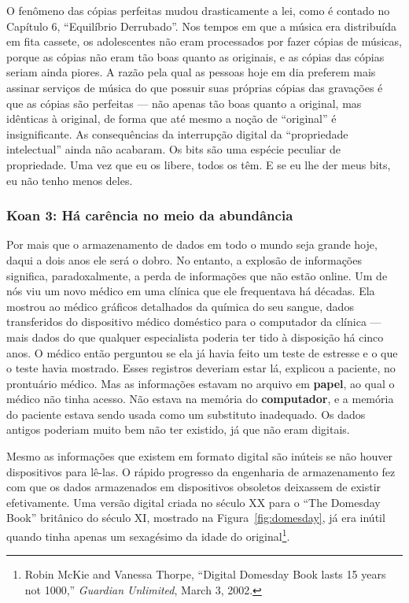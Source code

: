 O fenômeno das cópias perfeitas mudou drasticamente a lei, como é contado no
Capítulo 6, ``Equilíbrio Derrubado''. Nos tempos em que a música era distribuída
em fita cassete, os adolescentes não eram processados por fazer cópias de 
músicas, porque as cópias não eram tão boas quanto as originais, e as cópias das
cópias seriam ainda piores. A razão pela qual as pessoas hoje em dia preferem
mais assinar serviços de música do que possuir suas próprias cópias das
gravações é que as cópias são perfeitas --- não apenas tão boas quanto a
original, mas idênticas à original, de forma que até mesmo a noção de
``original'' é insignificante. As consequências da interrupção digital da
``propriedade intelectual'' ainda não acabaram. Os bits são uma espécie peculiar
de propriedade. Uma vez que eu os libere, todos os têm. E se eu lhe der meus
bits, eu não tenho menos deles.

\subsubsection*{Koan 3: Há carência no meio da abundância}
\label{cap1:exp-dig-koans:3}
Por mais que o armazenamento de dados em todo o mundo seja grande hoje, daqui a
dois anos ele será o dobro. No entanto, a explosão de informações significa, 
paradoxalmente, a perda de informações que não estão online. Um de nós viu um 
novo médico em uma clínica que ele frequentava há décadas. Ela mostrou ao médico
gráficos detalhados da química do seu sangue, dados transferidos do dispositivo
médico doméstico para o computador da clínica --- mais dados do que qualquer
especialista poderia ter tido à disposição há cinco anos. O médico então
perguntou se ela já havia feito um teste de estresse e o que o teste havia 
mostrado. Esses registros deveriam estar lá, explicou a paciente, no prontuário
médico. Mas as informações estavam no arquivo em \textbf{papel}, ao qual o 
médico não tinha acesso. Não estava na memória do \textbf{computador}, e a
memória do paciente estava sendo usada como um substituto inadequado. Os dados
antigos poderiam muito bem não ter existido, já que não eram digitais.

Mesmo as informações que existem em formato digital são inúteis se não houver 
dispositivos para lê-las. O rápido progresso da engenharia de armazenamento fez 
com que os dados armazenados em dispositivos obsoletos deixassem de existir 
efetivamente. Uma versão digital criada no século XX para o ``The Domesday
Book'' britânico do século XI, mostrado na
Figura~\ref{fig:domesday}, já era inútil quando tinha apenas um sexagésimo da
idade do original\footnote{Robin McKie and Vanessa Thorpe, ``Digital Domesday
  Book lasts 15 years not 1000,'' \textit{Guardian Unlimited}, March 3, 2002.}.

